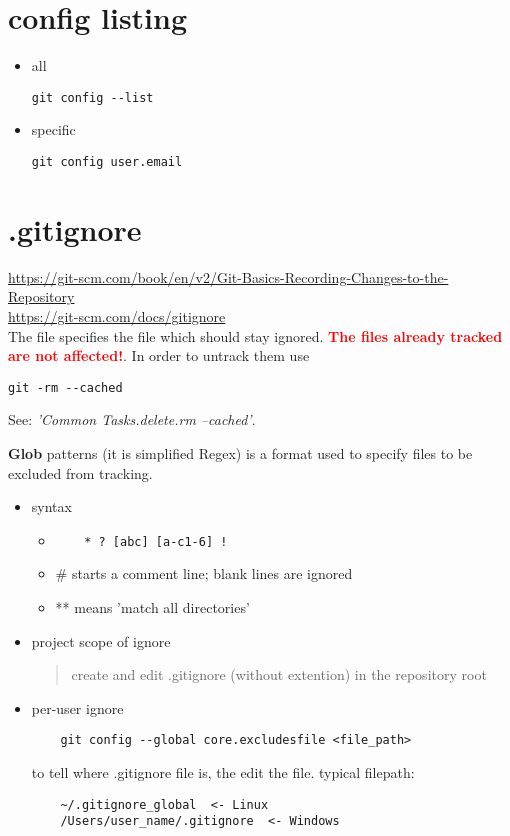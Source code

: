 \documentclass{report}
\begin{document}
\section{config listing}
\begin{itemize}
\item all
\begin{lstlisting}
git config --list
\end{lstlisting}

\item specific
\begin{lstlisting}
git config user.email
\end{lstlisting}
\end{itemize}


\section{.gitignore}
\url{https://git-scm.com/book/en/v2/Git-Basics-Recording-Changes-to-the-Repository}\\
\url{https://git-scm.com/docs/gitignore}\\

The file specifies the file which should stay ignored. \textbf{\textcolor{red}{The files already tracked
are not affected!}}. In order to untrack them use
\begin{verbatim}
git -rm --cached
\end{verbatim} 
See: \textit{'Common Tasks.delete.rm --cached'}.

\textbf{Glob} patterns (it is simplified Regex) is a format used to specify files to be excluded from tracking.

\begin{itemize}
	\item syntax
	\begin{itemize}
		\item
	\begin{verbatim}
	* ? [abc] [a-c1-6] !
	\end{verbatim}

		\item	\# starts a comment line; blank lines are ignored
		\item ** means 'match all directories'
	\end{itemize}
	
	\item project scope of ignore
	\begin{quote}
		create and edit .gitignore (without extention) in the repository root
	\end{quote}
	
	\item per-user ignore
	\begin{verbatim}
	git config --global core.excludesfile <file_path>
	\end{verbatim}
	to tell where .gitignore file is, the edit the file. typical filepath:
	\begin{verbatim}
	~/.gitignore_global  <- Linux
	/Users/user_name/.gitignore  <- Windows
	\end{verbatim}
\end{itemize}
\end{document}
